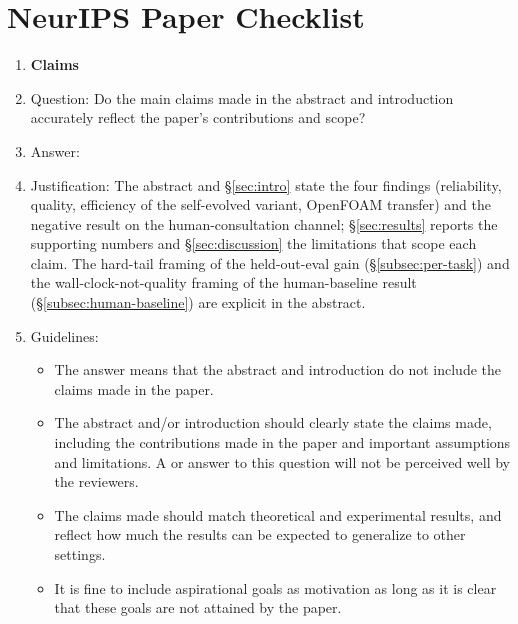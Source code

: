 \section*{NeurIPS Paper Checklist}


\begin{enumerate}

\item {\bf Claims}
    \item[] Question: Do the main claims made in the abstract and introduction accurately reflect the paper's contributions and scope?
    \item[] Answer: \answerYes{}
    \item[] Justification: The abstract and \S\ref{sec:intro} state the four findings (reliability, quality, efficiency of the self-evolved variant, OpenFOAM transfer) and the negative result on the human-consultation channel; \S\ref{sec:results} reports the supporting numbers and \S\ref{sec:discussion} the limitations that scope each claim. The hard-tail framing of the held-out-eval gain (\S\ref{subsec:per-task}) and the wall-clock-not-quality framing of the human-baseline result (\S\ref{subsec:human-baseline}) are explicit in the abstract.
    \item[] Guidelines:
    \begin{itemize}
        \item The answer \answerNA{} means that the abstract and introduction do not include the claims made in the paper.
        \item The abstract and/or introduction should clearly state the claims made, including the contributions made in the paper and important assumptions and limitations. A \answerNo{} or \answerNA{} answer to this question will not be perceived well by the reviewers.
        \item The claims made should match theoretical and experimental results, and reflect how much the results can be expected to generalize to other settings.
        \item It is fine to include aspirational goals as motivation as long as it is clear that these goals are not attained by the paper.
    \end{itemize}


\end{enumerate}
